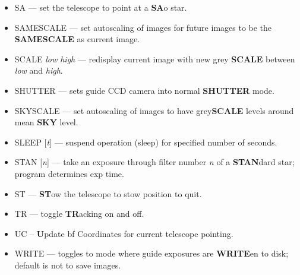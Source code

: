 \begin{itemize}
\item{{SA} --- set the telescope to point at a {\bf SA}o star.}
\item{{SAMESCALE} --- set autoscaling of images for future images to be the {\bf SAMESCALE} as current image.}
\item{{SCALE {\it low high}} --- redisplay current image with new grey {\bf SCALE} between {\it low} and {\it high}.}
\item{{SHUTTER} --- sets guide CCD camera into normal {\bf SHUTTER} mode.}
\item{{SKYSCALE} --- set autoscaling of images to have grey{\bf SCALE} levels around mean {\bf SKY} level.}
\item{{SLEEP [{\it t}]} --- suspend operation (sleep) for specified number of seconds.}
\item{{STAN [{\it n}]} --- take an exposure through filter number {\it n} of a {\bf STAN}dard star; program determines exp time.}
\item{{ST} --- {\bf ST}ow the telescope to stow position to quit.}

\item{{TR} --- toggle {\bf TR}acking on and off.}

\item{{UC} -- {\bf U}pdate {bf C}oordinates for current telescope pointing.}

\item{{WRITE} --- toggles to mode where guide exposures are {\bf WRITE}en to disk; default is not to save images.}

\end{itemize}
